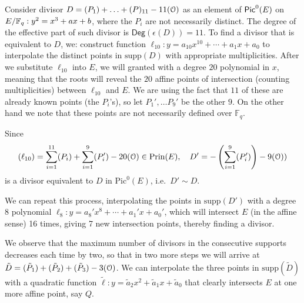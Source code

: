 \begin{example}
	Consider divisor $D = (P_1) + \ldots + (P)_{11} - 11(\mathFormulaEllipticCurvePointAtInfinity)$ as an element of $\mathFormulaPicardGroupWithIndexPar{E}{0}$ on $E/\FieldF_q: y^2 = x^3 + ax + b$, where the $P_i$ are not necessarily distinct. The degree of the effective part of such divisor is $\mathsf{Deg}(\epsilon(D)) = 11$. To find a divisor that is equivalent to $D$, we: 
	construct function $\ell_{10} : y = a_{10}x^{10} + \cdots + a_1x + a_0$ to interpolate the distinct points in $\text{supp}(D)$ with appropriate multiplicities. After we substitute $\ell_{10}$ into $E$, we will granted with a degree $20$ polynomial in $x$, meaning that the roots will reveal the $20$ affine points of intersection (counting multiplicities) between $\ell_{10}$ and $E$.  We are using the fact that $11$ of these are already known points (the $P_i$'s), so let $P_1', \ldots P_9'$ be the other $9$. On the other hand we note that these points are not necessarily defined over $\mathbb{F}_q$. 
	
	Since
	$$(\ell_{10}) = \sum_{i=1}^{11}(P_i) + \sum_{i=1}^{9}(P_i') - 20(\mathFormulaEllipticCurvePointAtInfinity) \in \text{Prin}(E), \quad D' = -\left(\sum_{i=1}^{9}(P_i')\right) - 9(\mathFormulaEllipticCurvePointAtInfinity))$$
	is a divisor equivalent to $D$ in $\text{Pic}^0(E)$, i.e.\ $D' \sim D$.
	
		
	We can repeat this process, interpolating the points in $\text{supp}(D')$ with a degree 8 polynomial $\ell_8 : y = a_8'x^8 + \cdots + a_1'x + a_0'$, which will intersect $E$ (in the affine sense) 16 times, giving 7 new intersection points, thereby finding a divisor. 
		
	We observe that the maximum number of divisors in the consecutive supports decreases each time by two, so that in two more steps we will arrive at $\tilde{D} = (\tilde{P}_1) + (\tilde{P}_2) + (\tilde{P}_3) - 3(\mathFormulaEllipticCurvePointAtInfinity)$. We can interpolate the three points in $\text{supp}(\tilde{D})$ with a quadratic function $\tilde{\ell} : y = \tilde{a}_2 x^2 + \tilde{a}_1 x + \tilde{a}_0$ that clearly intersects $E$ at one more affine point, say $Q$. 
	

\end{example}
